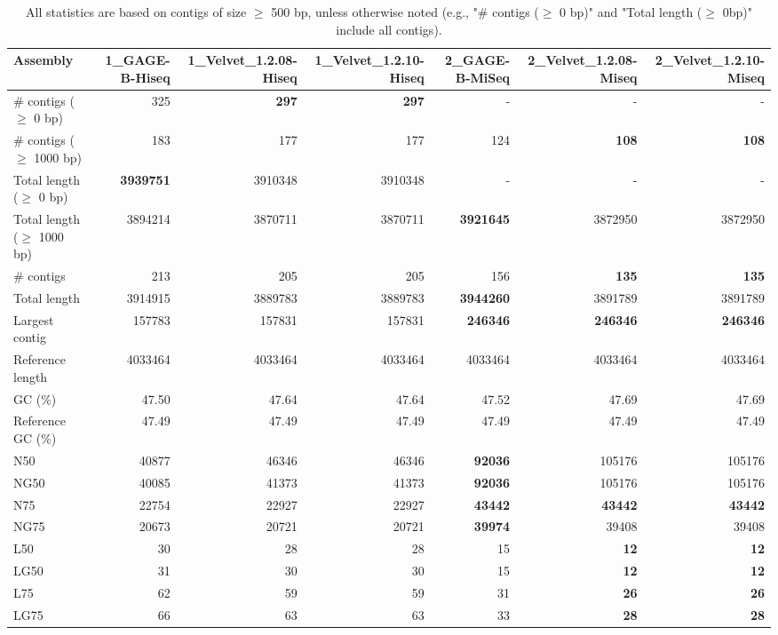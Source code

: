 \documentclass[12pt,a4paper]{article}
\begin{document}
\begin{table}[ht]
\begin{center}
\caption{All statistics are based on contigs of size $\geq$ 500 bp, unless otherwise noted (e.g., "\# contigs ($\geq$ 0 bp)" and "Total length ($\geq$ 0bp)" include all contigs).}
\begin{tabular}{|l*{6}{|r}|}
\hline
Assembly & 1\_GAGE-B-Hiseq & 1\_Velvet\_1.2.08-Hiseq & 1\_Velvet\_1.2.10-Hiseq & 2\_GAGE-B-MiSeq & 2\_Velvet\_1.2.08-Miseq & 2\_Velvet\_1.2.10-Miseq \\ \hline
\# contigs ($\geq$ 0 bp) & 325 & {\bf 297} & {\bf 297} & - & - & - \\ \hline
\# contigs ($\geq$ 1000 bp) & 183 & 177 & 177 & 124 & {\bf 108} & {\bf 108} \\ \hline
Total length ($\geq$ 0 bp) & {\bf 3939751} & 3910348 & 3910348 & - & - & - \\ \hline
Total length ($\geq$ 1000 bp) & 3894214 & 3870711 & 3870711 & {\bf 3921645} & 3872950 & 3872950 \\ \hline
\# contigs & 213 & 205 & 205 & 156 & {\bf 135} & {\bf 135} \\ \hline
Total length & 3914915 & 3889783 & 3889783 & {\bf 3944260} & 3891789 & 3891789 \\ \hline
Largest contig & 157783 & 157831 & 157831 & {\bf 246346} & {\bf 246346} & {\bf 246346} \\ \hline
Reference length & 4033464 & 4033464 & 4033464 & 4033464 & 4033464 & 4033464 \\ \hline
GC (\%) & 47.50 & 47.64 & 47.64 & 47.52 & 47.69 & 47.69 \\ \hline
Reference GC (\%) & 47.49 & 47.49 & 47.49 & 47.49 & 47.49 & 47.49 \\ \hline
N50 & 40877 & 46346 & 46346 & {\bf 92036} & 105176 & 105176 \\ \hline
NG50 & 40085 & 41373 & 41373 & {\bf 92036} & 105176 & 105176 \\ \hline
N75 & 22754 & 22927 & 22927 & {\bf 43442} & {\bf 43442} & {\bf 43442} \\ \hline
NG75 & 20673 & 20721 & 20721 & {\bf 39974} & 39408 & 39408 \\ \hline
L50 & 30 & 28 & 28 & 15 & {\bf 12} & {\bf 12} \\ \hline
LG50 & 31 & 30 & 30 & 15 & {\bf 12} & {\bf 12} \\ \hline
L75 & 62 & 59 & 59 & 31 & {\bf 26} & {\bf 26} \\ \hline
LG75 & 66 & 63 & 63 & 33 & {\bf 28} & {\bf 28} \\ \hline

\end{tabular}
\end{center}
\end{table}
\end{document}
